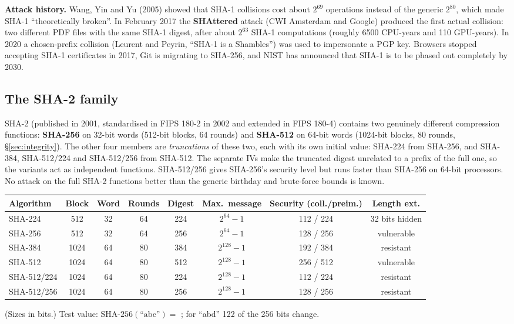 \textbf{Attack history.} Wang, Yin and Yu (2005) showed that SHA-1 collisions cost about $2^{69}$ operations instead of the generic $2^{80}$, which made SHA-1 ``theoretically broken''. In February 2017 the \textbf{SHAttered} attack (CWI Amsterdam and Google) produced the first actual collision: two different PDF files with the same SHA-1 digest, after about $2^{63}$ SHA-1 computations (roughly 6500 CPU-years and 110 GPU-years). In 2020 a chosen-prefix collision (Leurent and Peyrin, ``SHA-1 is a Shambles'') was used to impersonate a PGP key. Browsers stopped accepting SHA-1 certificates in 2017, Git is migrating to SHA-256, and NIST has announced that SHA-1 is to be phased out completely by 2030.

\subsection{The SHA-2 family \new}

SHA-2 (published in 2001, standardised in FIPS 180-2 in 2002 and extended in FIPS 180-4) contains two genuinely different compression functions: \textbf{SHA-256} on 32-bit words (512-bit blocks, 64 rounds) and \textbf{SHA-512} on 64-bit words (1024-bit blocks, 80 rounds, \S\ref{sec:integrity}). The other four members are \emph{truncations} of these two, each with its own initial value: SHA-224 from SHA-256, and SHA-384, SHA-512/224 and SHA-512/256 from SHA-512. The separate IVs make the truncated digest unrelated to a prefix of the full one, so the variants act as independent functions. SHA-512/256 gives SHA-256's security level but runs faster than SHA-256 on 64-bit processors. No attack on the full SHA-2 functions better than the generic birthday and brute-force bounds is known.
\begin{center}\small
\begin{tabular}{@{}lccccccc@{}}
\toprule
Algorithm & Block & Word & Rounds & Digest & Max.\ message & Security (coll./preim.) & Length ext.\\
\midrule
SHA-224 & 512 & 32 & 64 & 224 & $2^{64} - 1$ & 112 / 224 & 32 bits hidden\\
SHA-256 & 512 & 32 & 64 & 256 & $2^{64} - 1$ & 128 / 256 & vulnerable\\
SHA-384 & 1024 & 64 & 80 & 384 & $2^{128} - 1$ & 192 / 384 & resistant\\
SHA-512 & 1024 & 64 & 80 & 512 & $2^{128} - 1$ & 256 / 512 & vulnerable\\
SHA-512/224 & 1024 & 64 & 80 & 224 & $2^{128} - 1$ & 112 / 224 & resistant\\
SHA-512/256 & 1024 & 64 & 80 & 256 & $2^{128} - 1$ & 128 / 256 & resistant\\
\bottomrule
\end{tabular}
\end{center}
(Sizes in bits.) Test value: $\mathrm{SHA\text{-}256}(\text{``abc''}) = $ ; for ``abd'' 122 of the 256 bits change.

